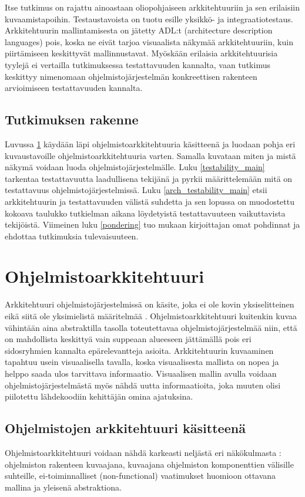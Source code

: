 \documentclass[finnish]{tktltiki2}
\numberwithin{table}{section}
\theoremstyle{definition}
\theoremstyle{remark}
\begin{document}
Itse tutkimus on rajattu ainoastaan oliopohjaiseen arkkitehtuuriin ja sen erilaisiin kuvaamistapoihin. Testaustavoista on tuotu esille yksikkö- ja integraatiotestaus. Arkkitehtuurin mallintamisesta on jätetty ADL:t (architecture description languages) pois, koska ne eivät tarjoa visuaalista näkymää arkkitehtuuriin, kuin piirtämiseen keskittyvät mallinnustavat. Myöskään erilaisia arkkitehtuurisia tyylejä ei vertailla tutkimuksessa testattavuuden kannalta, vaan tutkimus keskittyy nimenomaan ohjelmistojärjestelmän konkreettisen rakenteen arvioimiseen testattavuuden kannalta.

\subsection{Tutkimuksen rakenne}

Luvussa \ref{software_architecture_main} käydään läpi ohjelmistoarkkitehtuuria käsitteenä ja luodaan pohja eri kuvaustavoille ohjelmistoarkkitehtuuria varten. Samalla kuvataan miten ja mistä näkymä voidaan luoda ohjelmistojärjestelmälle. Luku \ref{testability_main} tarkentaa testattavuutta laadullisena tekijänä ja pyrkii määrittelemään mitä on testattavuus ohjelmistojärjestelmissä. Luku \ref{arch_testability_main} etsii arkkitehtuurin ja testattavuuden välistä suhdetta ja sen lopussa on muodostettu kokoava taulukko tutkielman aikana löydetyistä testattavuuteen vaikuttavista tekijöistä. Viimeinen luku \ref{pondering} tuo mukaan kirjoittajan omat pohdinnat ja ehdottaa tutkimuksia tulevaisuuteen. 


\section{Ohjelmistoarkkitehtuuri} \label{software_architecture_main}
Arkkitehtuuri ohjelmistojärjestelmissä on käsite, joka ei ole kovin yksiselitteinen eikä siitä ole yksimielistä määritelmää \citep[s. 363]{solms_what_2012}. 
Ohjelmistoarkkitehtuuri kuitenkin kuvaa vähintään aina abstraktilla tasolla toteutettavaa ohjelmistojärjestelmää niin, että on mahdollista keskittyä vain suppeaan alueeseen jättämällä pois eri sidosryhmien kannalta epärelevantteja asioita. Arkkitehtuurin kuvaaminen tapahtuu usein visuaalisella tavalla, koska visuaalisesta mallista on nopea ja helppo saada ulos tarvittava informaatio. Visuaalisen mallin avulla voidaan ohjelmistojärjestelmästä myös nähdä uutta informaatioita, joka muuten olisi piilotettu lähdekoodiin kehittäjän omina ajatuksina.   

\subsection{Ohjelmistojen arkkitehtuuri käsitteenä} \label{ark}
Ohjelmistoarkkitehtuuri voidaan nähdä karkeasti neljästä eri näkökulmasta  \citep[s. 2-7]{gorton_understanding_2011}:  ohjelmiston rakenteen kuvaajana, kuvaajana ohjelmiston komponenttien välisille suhteille, ei-toiminnalliset (non-functional) vaatimukset huomioon ottavana mallina ja yleisenä abstraktiona. 
\end{document}
